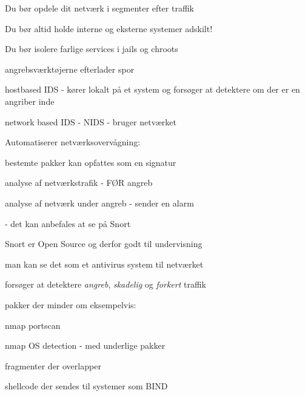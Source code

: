 \documentclass[Screen16to9,17pt]{foils}
\begin{document}
\begin{list1}
\item Du bør opdele dit netværk i segmenter efter traffik
\item Du bør altid holde interne og eksterne systemer adskilt!
\item Du bør isolere farlige services i jails og chroots
\end{list1}




\begin{list1}
  \item angrebsværktøjerne efterlader spor

\item hostbased IDS - kører lokalt på et system og forsøger at
  detektere om der er en angriber inde
\item network based IDS - NIDS - bruger netværket
\item Automatiserer netværksovervågning:
  \begin{list2}
  \item bestemte pakker kan opfattes som en signatur
\item analyse af netværkstrafik - FØR angreb
\item analyse af netværk under angreb - sender en alarm
  \end{list2}
\item {} - det kan anbefales at se på Snort
\end{list1}



\begin{list1}
\item Snort er Open Source og derfor godt til undervisning
\item man kan se det som et antivirus system til netværket
\item forsøger at detektere \emph{angreb}, \emph{skadelig} og
  \emph{forkert} traffik
\item pakker der minder om eksempelvis:
  \begin{list2}
    \item nmap portscan
\item nmap OS detection - med underlige pakker
\item fragmenter der overlapper
\item shellcode der sendes til systemer som BIND
  \end{list2}
\end{list1}
\end{document}
